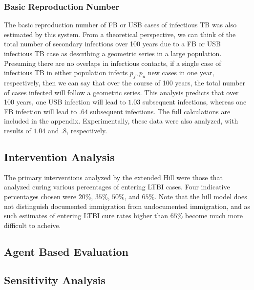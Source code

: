 \documentclass{amsart}
\begin{document}
\subsubsection{Basic Reproduction Number}
The basic reproduction number of FB or USB cases of infectious TB was also
estimated by this system. From a theoretical perspective, we can think of the
total number of secondary infections over 100 years due to a FB or USB
infectious TB case as describing a geometric series in a large population.
Presuming there are no overlaps in infectious contacts, if a single case of
infectious TB in either population infects $p_f, p_u$ new cases in one year,
respectively, then we can say that over the course of 100 years, the total
number of cases infected will follow a geometric series. This analysis predicts
that over 100 years, one USB infection will lead to $1.03$ subsequent infections,
whereas one FB infection will lead to $.64$ subsequent infections. The full calculations
are included in the appendix.  Experimentally, these data were also analyzed, 
with results of $1.04$ and $.8$, respectively. 

\subsection{Intervention Analysis}
The primary interventions analyzed by the extended Hill were those that analyzed
curing various percentages of entering LTBI cases. Four indicative percentages
chosen were $20\%$, $35\%$, $50\%$, and $65\%$. Note that the hill model does
not distinguish documented immigration from undocumented immigration, and as
such estimates of entering LTBI cure rates higher than $65\%$ become much more
difficult to acheive. 

\subsection{Agent Based Evaluation}
\subsection{Sensitivity Analysis}
\end{document}
